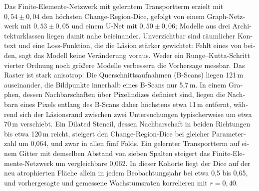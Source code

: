 \begin{otherlanguage}{ngerman}
\begin{abstract*}
Das Finite-Elemente-Netzwerk mit gelerntem Transportterm erzielt mit
$0{,}54 \pm 0{,}04$ den höchsten Change-Region-Dice, gefolgt von einem
Graph-Netzwerk mit $0{,}53 \pm 0{,}05$ und einem U-Net mit
$0{,}50 \pm 0{,}06$; Modelle aus drei Architekturklassen liegen damit nahe
beieinander. Unverzichtbar sind räumlicher Kontext und eine Loss-Funktion,
die die Läsion stärker gewichtet: Fehlt eines von beiden, sagt das Modell
keine Veränderung voraus. Weder ein Runge--Kutta-Schritt vierter Ordnung noch
größere Modelle verbessern die Vorhersage messbar. Das Raster
ist stark anisotrop: Die Querschnittsaufnahmen (B-Scans) liegen 121\,\textmu{}m auseinander, die Bildpunkte innerhalb eines B-Scans
nur 5,7\,\textmu{}m. In einem Graphen,
dessen Nachbarschaften über Pixelindizes definiert sind, liegen die Nachbarn
eines Pixels entlang des B-Scans daher höchstens etwa 11\,\textmu{}m entfernt,
während sich der Läsionsrand zwischen zwei Untersuchungen typischerweise um
etwa 70\,\textmu{}m verschiebt. Ein Dilated Stencil, dessen Nachbarschaft in
beiden Richtungen bis etwa 120\,\textmu{}m reicht, steigert den
Change-Region-Dice bei gleicher Parameterzahl um 0,064, und zwar in allen
fünf Folds. Ein gelernter Transportterm auf einem Gitter mit demselben
Abstand von sieben Spalten steigert das Finite-Elemente-Netzwerk um
vergleichbare 0,062. In dieser Kohorte liegt der Dice auf der neu
atrophierten Fläche allein in jedem Beobachtungsjahr bei etwa 0,5 bis 0,65,
und vorhergesagte und gemessene Wachstumsraten korrelieren mit
$r = 0{,}40$.
\end{abstract*}
\end{otherlanguage}

